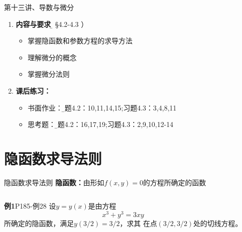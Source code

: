 \begin{frame}{第十三讲、导数与微分}
	\linespread{1.5}
	\begin{enumerate}
	  \item {\bf 内容与要求}{\b（ \S4.2-4.3 ）}
	  \begin{itemize}
	    \item 掌握隐函数和参数方程的求导方法
	    \item 理解微分的概念
	    \item 掌握微分法则
	  \end{itemize}
	  \item {\bf 课后练习：}
	  \begin{itemize}
	    \item 书面作业：{\b 习题4.2：10,11,14,15;习题4.3：3,4,8,11}
	    \item 思考题：{\b 习题4.2：16,17,19;习题4.3：2,9,10,12-14}
	  \end{itemize}
	\end{enumerate}
\end{frame}

\section{隐函数求导法则}

\begin{frame}{隐函数求导法则}\pause 
	\linespread{1.2}
	{\bf 隐函数：}由形如$f(x,y)=0$的方程所确定的函数\pause 
	\begin{columns}
			\begin{exampleblock}{{\bf 例1}\hfill P185-例28}
				设$y=y(x)$是由方程
				$$x^3+y^3=3xy$$
				所确定的隐函数，满足$y(3/2)=3/2$，求其
				在点$(3/2,3/2)$处的切线方程。
			\end{exampleblock}\pause 
			\begin{center}
			\end{center}
	\end{columns}
\end{frame}

